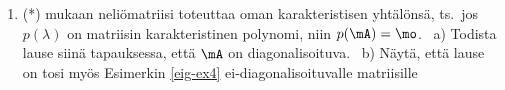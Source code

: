 \begin{enumerate}
\item (*) 
 mukaan neliömatriisi toteuttaa oman karakteristisen
yhtälönsä, ts.\ jos $p(\lambda)$ on matriisin karakteristinen polynomi, niin $p(\mA)=\mo$. \ 
a) Todista lause siinä tapauksessa, että $\mA$ on diagonalisoituva. \ b) Näytä, että lause on
tosi myös Esimerkin \ref{eig-ex4} ei-diagonalisoituvalle matriisille

\end{enumerate}